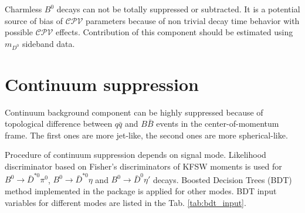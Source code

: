 \documentclass[preprint,aps,showpacs]{revtex4}
\newcommand{\cpvconj}{\ensuremath{\mathcal{CPV}}\xspace}
\newcommand{\bdetap}{\ensuremath{B^0\to \bar D^0\eta\prime}\xspace}
\newcommand{\btodstpi}{\ensuremath{B^0\to \bar D^{*0}\pi^0}\xspace}
\newcommand{\btodsteta}{\ensuremath{B^0\to \bar D^{*0}\eta}\xspace}
\begin{document}
Charmless $B^0$ decays can not be totally suppressed or subtracted. It is a potential source of bias of \cpvconj parameters because of non trivial decay time behavior with possible \cpvconj effects. Contribution of this component should be estimated using $m_{D^0}$ sideband data.

\clearpage
\section{Continuum suppression}
Continuum background component can be highly suppressed because of topological difference between $q\bar q$ and $B\bar B$ events in the center-of-momentum frame. The first ones are more jet-like, the second ones are more spherical-like.

Procedure of continuum suppression depends on signal mode. Likelihood discriminator based on Fisher's discriminators of KFSW moments \cite{SFW,KSFW} is used for \btodstpi, \btodsteta and \bdetap decays. Boosted Decision Trees (BDT) method \cite{BDT} implemented in the \verb@TMVA@ package \cite{TMVA} is applied for other modes. BDT input variables for different modes are listed in the Tab. \ref{tab:bdt_input}.
\end{document}
